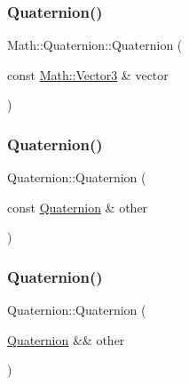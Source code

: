 \mbox{\label{struct_math_1_1_quaternion_aee457d8f04d226335213714897d752dd}} 
\subsubsection{\texorpdfstring{Quaternion()}{Quaternion()}\hspace{0.1cm}{\footnotesize\ttfamily [4/6]}}
{\footnotesize\ttfamily Math\+::\+Quaternion\+::\+Quaternion (\begin{DoxyParamCaption}\item[{const \mbox{\hyperlink{struct_math_1_1_vector3}{Math\+::\+Vector3}} \&}]{vector }\end{DoxyParamCaption})}

\mbox{\label{struct_math_1_1_quaternion_acae9b6b6548813cbcbd1f5b641e4f064}} 
\subsubsection{\texorpdfstring{Quaternion()}{Quaternion()}\hspace{0.1cm}{\footnotesize\ttfamily [5/6]}}
{\footnotesize\ttfamily Quaternion\+::\+Quaternion (\begin{DoxyParamCaption}\item[{const \mbox{\hyperlink{struct_math_1_1_quaternion}{Quaternion}} \&}]{other }\end{DoxyParamCaption})}

\mbox{\label{struct_math_1_1_quaternion_a68ab22588ee547c1b03c58f717b5f838}} 
\subsubsection{\texorpdfstring{Quaternion()}{Quaternion()}\hspace{0.1cm}{\footnotesize\ttfamily [6/6]}}
{\footnotesize\ttfamily Quaternion\+::\+Quaternion (\begin{DoxyParamCaption}\item[{\mbox{\hyperlink{struct_math_1_1_quaternion}{Quaternion}} \&\&}]{other }\end{DoxyParamCaption})}



